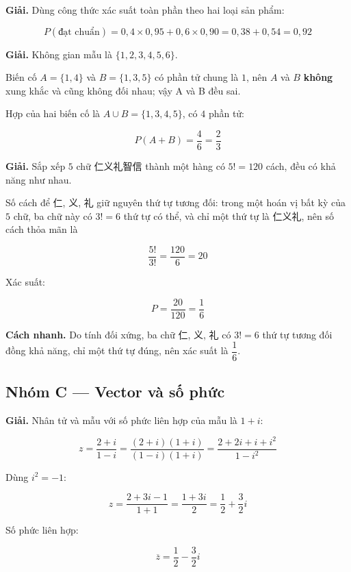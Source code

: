 \documentclass[11pt, a4paper]{article}
\begin{document}
\begin{dapan}[17 — Đáp án B]
\textbf{Giải.} Dùng công thức xác suất toàn phần theo hai loại sản phẩm:

$$P(\text{đạt chuẩn}) = 0{,}4 \times 0{,}95 + 0{,}6 \times 0{,}90 = 0{,}38 + 0{,}54 = 0{,}92$$
\end{dapan}

\begin{dapan}[18 — Đáp án C]
\textbf{Giải.} Không gian mẫu là $\{1, 2, 3, 4, 5, 6\}$.

Biến cố $A = \{1, 4\}$ và $B = \{1, 3, 5\}$ có phần tử chung là $1$, nên $A$ và $B$ \textbf{không} xung khắc và cũng không đối nhau; vậy A và B đều sai.

Hợp của hai biến cố là $A \cup B = \{1, 3, 4, 5\}$, có $4$ phần tử:

$$P(A + B) = \frac{4}{6} = \frac{2}{3}$$
\end{dapan}

\begin{dapan}[19 — Đáp án D]
\textbf{Giải.} Sắp xếp $5$ chữ 仁义礼智信 thành một hàng có $5! = 120$ cách, đều có khả năng như nhau.

Số cách để 仁, 义, 礼 giữ nguyên thứ tự tương đối: trong một hoán vị bất kỳ của $5$ chữ, ba chữ này có $3! = 6$ thứ tự có thể, và chỉ một thứ tự là 仁义礼, nên số cách thỏa mãn là

$$\frac{5!}{3!} = \frac{120}{6} = 20$$

Xác suất:

$$P = \frac{20}{120} = \frac{1}{6}$$

\textbf{Cách nhanh.} Do tính đối xứng, ba chữ 仁, 义, 礼 có $3! = 6$ thứ tự tương đối đồng khả năng, chỉ một thứ tự đúng, nên xác suất là $\dfrac{1}{6}$.
\end{dapan}

\subsection*{Nhóm C — Vector và số phức}

\begin{dapan}[20 — Đáp án B]
\textbf{Giải.} Nhân tử và mẫu với số phức liên hợp của mẫu là $1 + i$:

$$z = \frac{2+i}{1-i} = \frac{(2+i)(1+i)}{(1-i)(1+i)} = \frac{2 + 2i + i + i^2}{1 - i^2}$$

Dùng $i^2 = -1$:

$$z = \frac{2 + 3i - 1}{1 + 1} = \frac{1 + 3i}{2} = \frac{1}{2} + \frac{3}{2}i$$

Số phức liên hợp:

$$\overline{z} = \frac{1}{2} - \frac{3}{2}i$$
\end{dapan}
\end{document}
